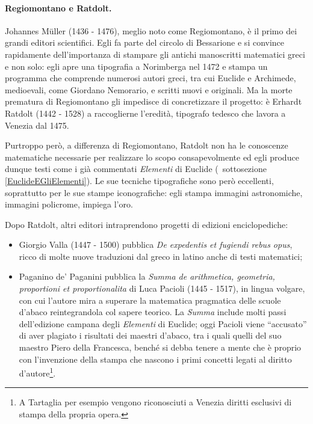 \paragraph{Regiomontano e Ratdolt.} Johannes M\"uller (1436 - 1476), meglio noto come Regiomontano, \`e il primo dei grandi editori scientifici. Egli fa parte del circolo di Bessarione e si convince rapidamente dell'importanza di stampare gli antichi manoscritti matematici greci e non solo: egli apre una tipografia a Norimberga nel 1472 e stampa un programma che comprende numerosi autori greci, tra cui Euclide e Archimede, medioevali, come Giordano Nemorario, e scritti nuovi e originali. Ma la morte prematura di Regiomontano gli impedisce di concretizzare il progetto: \`e Erhardt Ratdolt (1442 - 1528) a raccoglierne l'eredit\`a, tipografo tedesco che lavora a Venezia dal 1475.
\par Purtroppo per\`o, a differenza di Regiomontano, Ratdolt non ha le conoscenze matematiche necessarie per realizzare lo scopo consapevolmente ed egli produce dunque testi come i gi\`a commentati \textit{Elementi} di Euclide (\Cfr\ sottosezione \ref{EuclideEGliElementi}). Le sue tecniche tipografiche sono per\`o eccellenti, soprattutto per le sue stampe iconografiche: egli stampa immagini astronomiche, immagini policrome, impiega l'oro.
\par Dopo Ratdolt, altri editori intraprendono progetti di edizioni enciclopediche:
\begin{itemize}
	\item Giorgio Valla (1447 - 1500) pubblica \textit{De expedentis et fugiendi rebus opus}, ricco di molte nuove traduzioni dal greco in latino anche di testi matematici;
	\item Paganino de' Paganini pubblica la \textit{Summa de arithmetica, geometria, proportioni et proportionalita} di Luca Pacioli (1445 - 1517), in lingua volgare, con cui l'autore mira a superare la matematica pragmatica delle scuole d'abaco reintegrandola col sapere teorico. La \textit{Summa} include molti passi dell'edizione campana degli \textit{Elementi} di Euclide; oggi Pacioli viene ``accusato'' di aver plagiato i risultati dei maestri d'abaco, tra i quali quelli del suo maestro Piero della Francesca, bench\'e si debba tenere a mente che \`e proprio con l'invenzione della stampa che nascono i primi concetti legati al diritto d'autore\footnote{A Tartaglia per esempio vengono riconosciuti a Venezia diritti esclusivi di stampa della propria opera.}.
\end{itemize}
